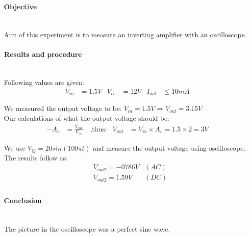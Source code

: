 \paragraph*{Objective} \hfill \\
Aim of this experiment is to measure an inverting amplifier with an oscilloscope.
\paragraph*{Results and procedure} \hfill\\
Following values are given:
\begin{align*}
V_{in}&= 1.5V	&	V_{cc}&= 12V	&	I_{out}&\leqslant 10mA
\end{align*}

We measured the output voltage to be: $ V_{in}=1.5V \Rightarrow V_{out}= 3.15V $ \\

Our calculations of what the output voltage should be:
\begin{align*}
-A_{v}&= \frac{V_{out}}{V_{in}} \,\,\,\,\,\,\text{,thus:}	&	V_{out}&=V_{in} \times A_{v} = 1.5 \times 2 = 3 V
\end{align*}

We use $ V_{i2}=20sin(100\pi t) $ and measure the output voltage using oscilloscope. The results follow as:
\begin{align*}
&V_{out2}= -0786V & (AC) \\
&V_{out2}= 1.59V	&  (DC)\\
\end{align*}

\paragraph*{Conclusion} \hfill \\
The picture in the oscilloscope was a perfect sine wave.
